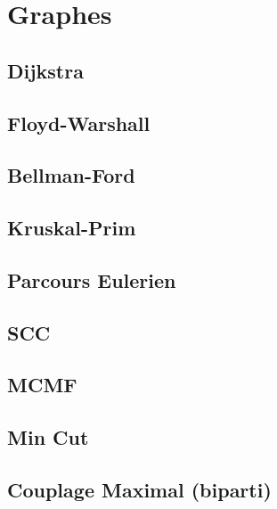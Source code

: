 \documentclass[10pt]{article}
\begin{document}
\tableofcontents\vspace{0.5cm}

\section{Graphes}
\subsection{Dijkstra}
{\scriptsize}

\subsection{Floyd-Warshall}
{\scriptsize}

\subsection{Bellman-Ford}
{\scriptsize}

\subsection{Kruskal-Prim}
{\scriptsize}

\subsection{Parcours Eulerien}
{\scriptsize}

\subsection{SCC}
{\scriptsize}

\subsection{MCMF}
{\scriptsize}

\subsection{Min Cut}
{\scriptsize}

\subsection{Couplage Maximal (biparti)}
{\scriptsize}
\end{document}
